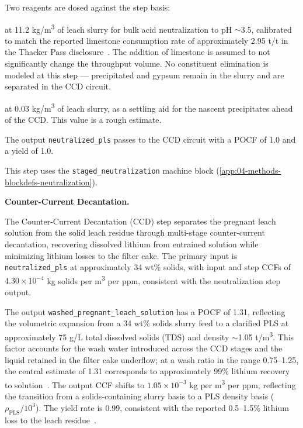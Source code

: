 Two reagents are dosed against the step basis:
\begin{description}[noitemsep, topsep=0pt]
\item[\textbullet\enskip Limestone (\ce{CaCO3})] at 11.2 kg/m\textsuperscript{3} of leach slurry for bulk acid neutralization to pH $\sim$3.5, calibrated to match the reported limestone consumption rate of approximately 2.95 t/t  in the Thacker Pass disclosure~\cite{sgscanadaincSK1300Technical2024}. The addition of limestone is assumed to not significantly change the throughput volume. No constituent elimination is modeled at this step --- precipitated  and gypsum remain in the slurry and are separated in the CCD circuit. 
\item[\textbullet\enskip Flocculant] at 0.03 kg/m\textsuperscript{3} of leach slurry, as a settling aid for the nascent precipitates ahead of the CCD. This value is a rough estimate.
\end{description}

The output \texttt{neutralized\_pls} passes to the CCD circuit with a POCF of 1.0 and a yield of 1.0.

This step uses the \texttt{staged\_neutralization} machine block (\ref{app:04-methods-blockdefs-neutralization}).

\medskip
\noindent\textbf{Counter-Current Decantation.}\quad

The Counter-Current Decantation (CCD) step separates the pregnant leach solution from the solid leach residue through multi-stage counter-current decantation, recovering dissolved lithium from entrained solution while minimizing lithium losses to the filter cake. The primary input is \texttt{neutralized\_pls} at approximately 34 wt\% solids, with input and step CCFs of $4.30 \times 10^{-4}$ kg solids per m\textsuperscript{3} per ppm, consistent with the neutralization step output.

The output \texttt{washed\_pregnant\_leach\_solution} has a POCF of 1.31, reflecting the volumetric expansion from a 34 wt\% solids slurry feed to a clarified PLS at approximately 75 g/L total dissolved solids (TDS) and density $\sim$1.05 t/m\textsuperscript{3}. This factor accounts for the wash water introduced across the CCD stages and the liquid retained in the filter cake underflow; at a wash ratio in the range 0.75--1.25, the central estimate of 1.31 corresponds to approximately 99\% lithium recovery to solution~\cite{sgscanadaincSK1300Technical2024}. The output CCF shifts to $1.05 \times 10^{-3}$ kg per m\textsuperscript{3} per ppm, reflecting the transition from a solids-containing slurry basis to a PLS density basis ($\rho_{\text{PLS}} / 10^3$). The yield rate is 0.99, consistent with the reported 0.5--1.5\% lithium loss to the leach residue~\cite{sgscanadaincSK1300Technical2024}.

